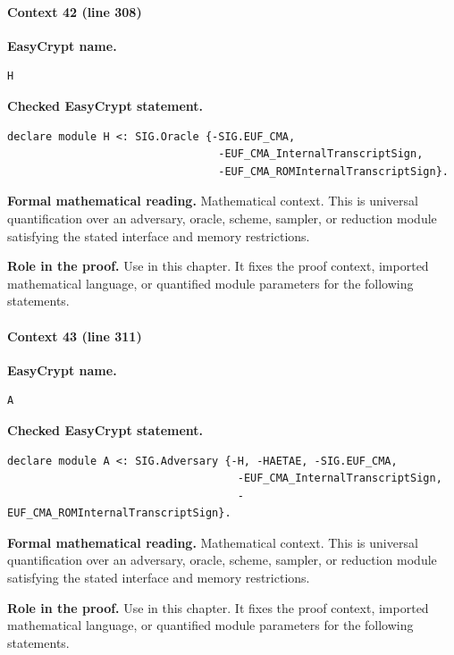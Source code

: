 \paragraph{Context 42 (line 308)}
\noindent\textbf{EasyCrypt name.}
\begin{lstlisting}[language=EasyCrypt,basicstyle=\ttfamily\scriptsize]
H
\end{lstlisting}
\noindent\textbf{Checked EasyCrypt statement.}
\begin{lstlisting}[language=EasyCrypt,basicstyle=\ttfamily\scriptsize]
declare module H <: SIG.Oracle {-SIG.EUF_CMA,
                                 -EUF_CMA_InternalTranscriptSign,
                                 -EUF_CMA_ROMInternalTranscriptSign}.
\end{lstlisting}
\noindent\textbf{Formal mathematical reading.}
Mathematical context. This is universal quantification over an adversary, oracle, scheme, sampler, or reduction module satisfying the stated interface and memory restrictions.

\noindent\textbf{Role in the proof.}
Use in this chapter. It fixes the proof context, imported mathematical language, or quantified module parameters for the following statements.

\paragraph{Context 43 (line 311)}
\noindent\textbf{EasyCrypt name.}
\begin{lstlisting}[language=EasyCrypt,basicstyle=\ttfamily\scriptsize]
A
\end{lstlisting}
\noindent\textbf{Checked EasyCrypt statement.}
\begin{lstlisting}[language=EasyCrypt,basicstyle=\ttfamily\scriptsize]
declare module A <: SIG.Adversary {-H, -HAETAE, -SIG.EUF_CMA,
                                    -EUF_CMA_InternalTranscriptSign,
                                    -EUF_CMA_ROMInternalTranscriptSign}.
\end{lstlisting}
\noindent\textbf{Formal mathematical reading.}
Mathematical context. This is universal quantification over an adversary, oracle, scheme, sampler, or reduction module satisfying the stated interface and memory restrictions.

\noindent\textbf{Role in the proof.}
Use in this chapter. It fixes the proof context, imported mathematical language, or quantified module parameters for the following statements.

